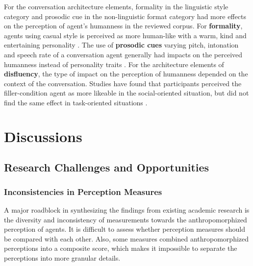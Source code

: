 \documentclass[sigconf,screen,review, anonymous]{acmart}
\newcommand{\cmt}[1]{}%
\begin{document}
For the conversation architecture elements, formality in the linguistic style category and prosodic cue in the non-linguistic format category had more effects on the perception of agent's humanness in the reviewed corpus. For \textbf{formality}, agents using casual style is perceived as more human-like with a warm, kind and entertaining personality \cite{cox2022does}\cmt{[27]}\cite{jestin2022effects}\cmt{[81]}\cite{kim2019comparing}\cmt{[89]}. The use of \textbf{prosodic cues} varying pitch, intonation and speech rate of a conversation agent generally had impacts on the perceived humanness instead of personality traits \cite{choi2020nobody}\cmt{[54]}\cite{jestin2022effects}\cmt{[81]}\cite{misu2011toward}\cmt{[83]}. For the architecture elements of \textbf{disfluency}, the type of impact on the perception of humanness depended on the context of the conversation. Studies have found that participants perceived the filler-condition agent as more likeable in the social-oriented situation, but did not find the same effect in task-oriented situations \cite{jeong2019exploring}\cmt{[10]}\cite{wester2015artificial}\cmt{[14]}.





\section{Discussions}

\subsection{Research Challenges and Opportunities}


\subsubsection{Inconsistencies in Perception Measures}

A major roadblock in synthesizing the findings from existing academic research is the diversity and inconsistency of measurements towards the anthropomorphized perception of agents. It is difficult to assess whether perception measures should be compared with each other. Also, some measures combined anthropomorphized perceptions into a composite score, which makes it impossible to separate the perceptions into more granular details.
\end{document}
